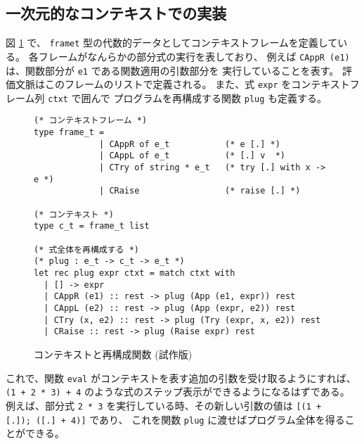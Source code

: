 \subsection{一次元的なコンテキストでの実装}
\label{subsection:stepper__before}

図 \ref{figure:simpleplug} で、 \texttt{frame\US t} 型の代数的データとしてコンテキストフレームを定義している。
各フレームがなんらかの部分式の実行を表しており、
例えば \texttt{CAppR (e1)} は、関数部分が \texttt{e1} である関数適用の引数部分を
実行していることを表す。
評価文脈はこのフレームのリストで定義される。
また、式 \texttt{expr} をコンテキストフレーム列 \texttt{ctxt} で囲んで
プログラムを再構成する関数 \texttt{plug} も定義する。

\begin{figure}
\begin{spacing}{0.8}
\begin{verbatim}
(* コンテキストフレーム *)
type frame_t = 
             | CAppR of e_t           (* e [.] *)
             | CAppL of e_t           (* [.] v  *)
             | CTry of string * e_t   (* try [.] with x -> e *)
             | CRaise                 (* raise [.] *)

(* コンテキスト *)
type c_t = frame_t list

(* 式全体を再構成する *)
(* plug : e_t -> c_t -> e_t *)
let rec plug expr ctxt = match ctxt with
  | [] -> expr
  | CAppR (e1) :: rest -> plug (App (e1, expr)) rest
  | CAppL (e2) :: rest -> plug (App (expr, e2)) rest
  | CTry (x, e2) :: rest -> plug (Try (expr, x, e2)) rest
  | CRaise :: rest -> plug (Raise expr) rest
\end{verbatim}
\end{spacing}
\caption{コンテキストと再構成関数 (試作版)}
\label{figure:simpleplug}
\end{figure}

これで、関数 \texttt{eval} がコンテキストを表す追加の引数を受け取るようにすれば、
\texttt{(1 + 2 * 3) + 4} のような式のステップ表示ができるようになるはずである。
例えば、部分式 \texttt{2 * 3} を実行している時、その新しい引数の値は
\texttt{[(1 + [.]);\ ([.]\ + 4)]} であり、
これを関数 \texttt{plug} に渡せばプログラム全体を得ることができる。

